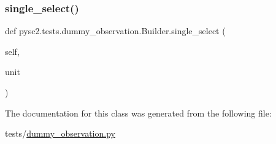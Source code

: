 \subsubsection{\texorpdfstring{single\+\_\+select()}{single\_select()}}
{\footnotesize\ttfamily def pysc2.\+tests.\+dummy\+\_\+observation.\+Builder.\+single\+\_\+select (\begin{DoxyParamCaption}\item[{}]{self,  }\item[{}]{unit }\end{DoxyParamCaption})}



The documentation for this class was generated from the following file\+:\begin{DoxyCompactItemize}
\item 
tests/\mbox{\hyperlink{dummy__observation_8py}{dummy\+\_\+observation.\+py}}\end{DoxyCompactItemize}
